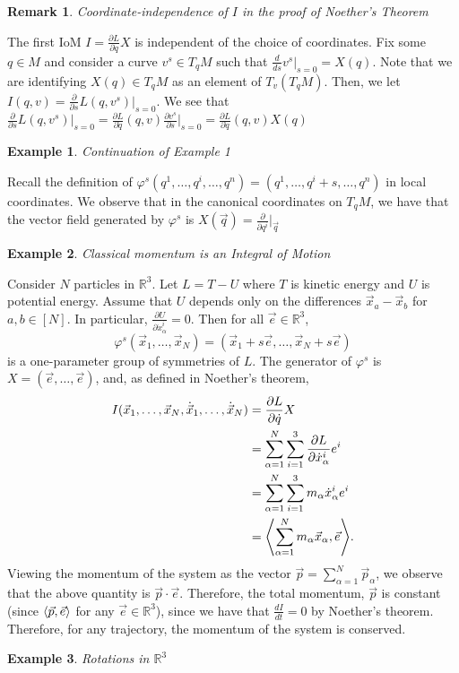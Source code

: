 \documentclass{article}
\newcommand{\R}{\mathbb R}
\newcommand{\al}{\alpha}
\newcommand{\vhi}{\varphi}
\newcommand{\pd}[1]{\frac{\partial}{\partial #1}}
\newcommand{\pdof}[2]{\frac{\partial #1}{\partial #2}}
\DeclarePairedDelimiter{\ang}{\langle}{\rangle}
\newtheorem{ex}{Example}
\newtheorem{rmk}{Remark}
\begin{document}
\begin{rmk}
    Coordinate-independence of $I$ in the proof of Noether's Theorem
\end{rmk}
The first IoM $I = \pdof{L}{\dot q}X$ is independent of the choice of coordinates. Fix some $q\in M$ and consider a curve $v^s\in T_qM$ such that $\frac{d}{ds} v^s\big|_{s=0} = X(q)$. Note that we are identifying $X(q)\in T_qM$ as an element of $T_v(T_qM)$. Then, we let $I(q,v) = \pd{s}L(q,v^s)\big|_{s=0}$. We see that $\pd{s}L(q,v^s)\big|_{s=0} = \pdof{L}{\dot q}(q,v)\pdof{v^s}{s}\big|_{s=0}  = \pdof{L}{\dot q}(q,v)X(q)$
\begin{ex}
    Continuation of Example 1
\end{ex}
Recall the definition of $\vhi^s(q^1,\dots, q^i,\dots,q^n) = (q^1,\dots, q^i+s,\dots,q^n)$ in local coordinates. We observe that in the canonical coordinates on $T_qM$, we have that the vector field generated by $\vhi^s$ is $X(\vec q) = \pd{q^i}\big|_{\vec q}$
\begin{ex}
    Classical momentum is an Integral of Motion
\end{ex}
Consider $N$ particles in $\R^3$. Let $L=T-U$ where $T$ is kinetic energy and $U$ is potential energy. Assume that $U$ depends only on the differences $\vec{x}_a - \vec{x}_b$ for $a,b\in [N]$. In particular, $\pdof{U}{\dot{x}^i_\al} = 0$. Then for all $\vec{e}\in\R^3$, 
\[\vhi^s(\vec x_1,\dots,\vec x_N) = (\vec x_1+s\vec e,\dots,\vec x_N+s\vec e)\]
is a one-parameter group of symmetries of $L$.
The generator of $\vhi^s$ is $X=(\vec e,\dots,\vec e)$, and, as defined in Noether's theorem,
\begin{align*}
    I(\vec x_1,\dots,\vec x_N,\dot{\vec{x}}_1,\dots,\dot{\vec{x}}_N) &= \pdof{L}{\dot q}X\\
    &= \sum_{\al=1}^N\sum_{i=1}^3\pdof{L}{\dot x^i_\al} e^i \\
    &= \sum_{\al=1}^N \sum_{i=1}^3m_\al\dot{x}^i_\al e^i\\
    &=  \ang*{\sum_{\al = 1}^N m_\al\vec x_\al, \vec e}.
\end{align*}
Viewing the momentum of the system as the vector $\vec p = \sum_{\al =1}^N \vec{p}_\al$, we observe that the above quantity is $\vec p \cdot \vec e$. Therefore, the total momentum, $\vec p$ is constant (since $\ang{\vec p, \vec{e}}$ for any $\vec e\in\R^3$), since we have that $\frac{dI}{dt} = 0$ by Noether's theorem. Therefore, for any trajectory, the momentum of the system is conserved.
\begin{ex}
    Rotations in $\R^3$
\end{ex}
\end{document}
